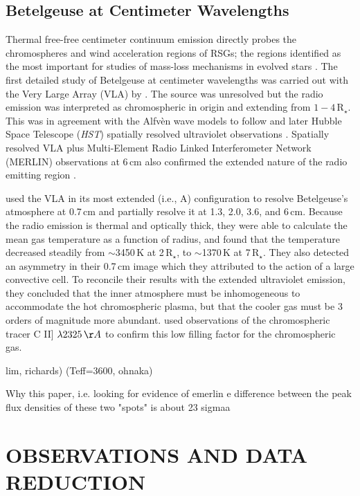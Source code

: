 \documentclass[iop]{emulateapj}
\begin{document}
\subsection{Betelgeuse at Centimeter Wavelengths}
Thermal free-free centimeter continuum emission directly probes the chromospheres and wind acceleration regions of RSGs; the regions identified as the most important for studies of mass-loss mechanisms in evolved stars \citep{holzer_1985}.  The first detailed study of Betelgeuse at centimeter wavelengths was carried out with the Very Large Array (VLA) by \cite{newell_1982}. The source was unresolved but the radio emission was interpreted as chromospheric in origin and extending from $1-4$\,R$_{\star}$. This was in agreement with the Alfv\`en wave models to follow \citep{hartmann_1984} and later Hubble Space Telescope (\textit{HST}) spatially resolved ultraviolet observations \citep{gilliland_1996,uitenbroek_1998}. Spatially resolved VLA plus Multi-Element Radio Linked Interferometer Network (MERLIN) observations at 6\,cm also confirmed the extended nature of the radio emitting region \citep{skinner_1997}. 

\cite{lim_1998} used the VLA in its most extended (i.e., A) configuration to resolve Betelgeuse's atmosphere at 0.7\,cm and partially resolve it at 1.3, 2.0, 3.6, and 6\,cm. Because the radio emission is thermal and optically thick, they were able to calculate the mean gas temperature as a function of radius, and found that the temperature decreased steadily from $\sim$3450\,K at 2\,R$_{\star}$, to $\sim$1370\,K at 7\,R$_{\star}$. They also detected an asymmetry in their 0.7\,cm image which they attributed to the action of a large convective cell. To reconcile their results with the extended ultraviolet emission, they concluded that the inner atmosphere must be inhomogeneous to accommodate the hot chromospheric plasma, but that the cooler gas must be 3 orders of magnitude more abundant. \cite{harper_2006} used observations of the chromospheric tracer C II] $\lambda 2325\,\AA$ to confirm this low filling factor for the chromospheric gas.	 


 lim, richards) (Teff=3600, ohnaka)

Why this paper, i.e. looking for evidence of emerlin
e difference between the peak flux
densities of these two "spots" is about 23 sigmaa


\section{OBSERVATIONS AND DATA REDUCTION}
\end{document}
